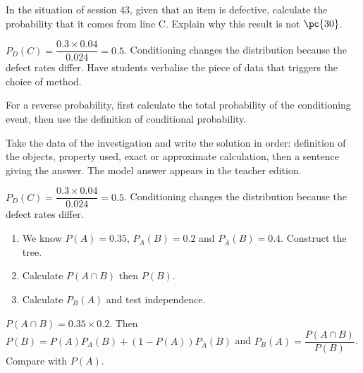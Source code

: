     \begin{activity}
    In the situation of session 43, given that an item is defective, calculate the probability that it comes from line C. Explain why this result is not $\pc{30}$.
    \begin{center}\end{center}
    \end{activity}
    \begin{solution}$P_D(C)=\dfrac{\num{0,3}\times\num{0,04}}{\num{0,024}}=\num{0,5}$. Conditioning changes the distribution because the defect rates differ. Have students verbalise the piece of data that triggers the choice of method.\end{solution}

    \begin{summary}For a reverse probability, first calculate the total probability of the conditioning event, then use the definition of conditional probability.\end{summary}

    \begin{example}
    Take the data of the investigation and write the solution in order: definition of the objects, property used, exact or approximate calculation, then a sentence giving the answer. The model answer appears in the teacher edition.
    \end{example}
    \begin{solution}$P_D(C)=\dfrac{\num{0,3}\times\num{0,04}}{\num{0,024}}=\num{0,5}$. Conditioning changes the distribution because the defect rates differ.\end{solution}

    \begin{exercise}[essential]
    \begin{enumerate}\item We know $P(A)=\num{0,35}$, $P_A(B)=\num{0,2}$ and $P_{\overline A}(B)=\num{0,4}$. Construct the tree.\item Calculate $P(A\cap B)$ then $P(B)$.\item Calculate $P_B(A)$ and test independence.\end{enumerate}
    \end{exercise}
    \begin{solution}$P(A\cap B)=\num{0,35}\times\num{0,2}$. Then $P(B)=P(A)P_A(B)+(1-P(A))P_{\overline A}(B)$ and $P_B(A)=\dfrac{P(A\cap B)}{P(B)}$. Compare with $P(A)$.\end{solution}

